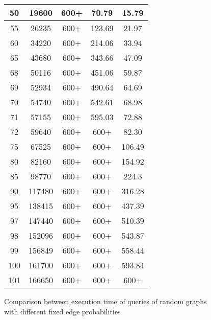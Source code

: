 \begin{figure}[htp]
\begin{center}
\begin{tabular}{ | c | c | c | c | c | }
	50 & 19600 & 600+ & 70.79 & 15.79  \\ \hline
	55 & 26235 & 600+ & 123.69 & 21.97  \\ \hline
	60 & 34220 & 600+ & 214.06 & 33.94  \\ \hline
	65 & 43680 & 600+ & 343.66 & 47.09  \\ \hline
	68 & 50116 & 600+ & 451.06 & 59.87  \\ \hline
	69 & 52934 & 600+ & 490.64 & 64.69  \\ \hline
	70 & 54740 & 600+ & 542.61 & 68.98  \\ \hline
	71 & 57155 & 600+ & 595.03 & 72.88  \\ \hline
	72 & 59640 & 600+ & 600+ & 82.30  \\ \hline
	75 & 67525 & 600+ & 600+ & 106.49  \\ \hline
	80 & 82160 & 600+ & 600+ & 154.92  \\ \hline
	85 & 98770 & 600+ & 600+ & 224.3  \\ \hline
	90 & 117480 & 600+ & 600+ & 316.28  \\ \hline
	95 & 138415 & 600+ & 600+ & 437.39  \\ \hline
	97 & 147440 & 600+ & 600+ & 510.39  \\ \hline
	98 & 152096 & 600+ & 600+ & 543.87  \\ \hline
	99 & 156849 & 600+ & 600+ & 558.44  \\ \hline
	100 & 161700 & 600+ & 600+ & 593.84  \\ \hline
	101 & 166650 & 600+ & 600+ & 600+  \\ \hline
	
  \end{tabular}
\end{center} 

\caption{Comparison between execution time of queries of random graphs with different fixed edge probabilities}

\label{fig:edge-prob}
\end{figure}

